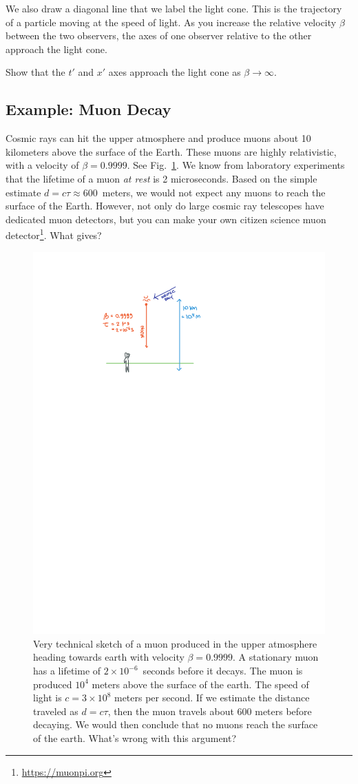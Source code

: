 \documentclass[12pt]{article}
\begin{document}
We also draw a diagonal line that we label the light cone. This is the trajectory of a particle moving at the speed of light. As you increase the relative velocity $\beta$ between the two observers, the axes of one observer relative to the other approach the light cone. 
\begin{exercise}
Show that the $t'$ and $x'$ axes approach the light cone as $\beta \to \infty$. 
\end{exercise}

\subsection{Example: Muon Decay}

Cosmic rays can hit the upper atmosphere and produce muons about 10 kilometers above the surface of the Earth. These muons are highly relativistic, with a velocity of $\beta = 0.9999$. See Fig.~\ref{fig:muons}. We know from laboratory experiments that the lifetime of a muon \emph{at rest} is 2 microseconds. Based on the simple estimate $d=c\tau \approx 600$~meters, we would not expect any muons to reach the surface of the Earth. However, not only do large cosmic ray telescopes have dedicated muon detectors, but you can make your own citizen science muon detector\footnote{\url{https://muonpi.org}}. What gives?



\begin{figure}[tb]
    \centering
    \includegraphics[width=.48\textwidth]{figures/muon.pdf}
    \caption{Very technical sketch of a muon produced in the upper atmosphere heading towards earth with velocity $\beta = 0.9999$. A stationary muon has a lifetime of $2\times10^{-6}$~seconds before it decays. The muon is produced $10^4$ meters above the surface of the earth. The speed of light is $c=3\times 10^{8}$ meters per second. If we estimate the distance traveled as $d = c\tau$, then the muon travels about $600$ meters before decaying. We would then conclude that no muons reach the surface of the earth. What's wrong with this argument?}
    \label{fig:muons}
\end{figure}
\end{document}
